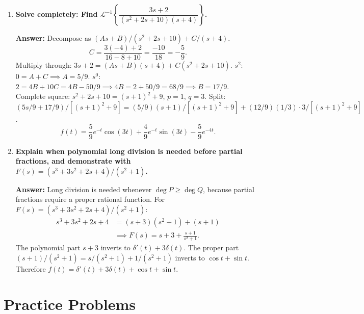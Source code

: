 \documentclass[12pt,a4paper]{article}
\begin{document}
\begin{enumerate}[label=\textbf{Q\arabic*.}, leftmargin=*, itemsep=1em]
\item \textbf{Solve completely: Find
  $\mathcal{L}^{-1}\!\left\{\dfrac{3s+2}{(s^2+2s+10)(s+4)}\right\}$.}

  \textbf{Answer:} Decompose as $(As+B)/(s^2+2s+10)+C/(s+4)$.
  \[
    C = \frac{3(-4)+2}{16-8+10}=\frac{-10}{18}=-\frac{5}{9}.
  \]
  Multiply through: $3s+2=(As+B)(s+4)+C(s^2+2s+10)$.
  $s^2$: $0=A+C\implies A=5/9$.
  $s^0$: $2=4B+10C=4B-50/9\implies 4B=2+50/9=68/9\implies B=17/9$.
  Complete square: $s^2+2s+10=(s+1)^2+9$, $p=1$, $q=3$.
  Split: $(5s/9+17/9)/[(s+1)^2+9]
  = (5/9)(s+1)/[(s+1)^2+9]+(12/9)(1/3)\cdot 3/[(s+1)^2+9]$.
  \[
    f(t)=\frac{5}{9}e^{-t}\cos(3t)+\frac{4}{9}e^{-t}\sin(3t)-\frac{5}{9}e^{-4t}.
  \]

\item \textbf{Explain when polynomial long division is needed before partial
  fractions, and demonstrate with $F(s)=(s^3+3s^2+2s+4)/(s^2+1)$.}

  \textbf{Answer:} Long division is needed whenever $\deg P \geq \deg Q$,
  because partial fractions require a proper rational function.
  For $F(s)=(s^3+3s^2+2s+4)/(s^2+1)$:
  \begin{align*}
    s^3+3s^2+2s+4 &= (s+3)(s^2+1) + (s+1) \\
    &\implies F(s) = s+3+\frac{s+1}{s^2+1}.
  \end{align*}
  The polynomial part $s+3$ inverts to $\delta'(t)+3\delta(t)$.
  The proper part $(s+1)/(s^2+1)=s/(s^2+1)+1/(s^2+1)$
  inverts to $\cos t+\sin t$.
  Therefore $f(t)=\delta'(t)+3\delta(t)+\cos t+\sin t$.

\end{enumerate}

\section{Practice Problems}
\end{document}
